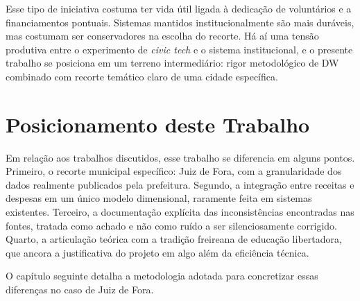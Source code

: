 Esse tipo de iniciativa costuma ter vida útil ligada à dedicação de voluntários e a financiamentos pontuais. Sistemas mantidos institucionalmente são mais duráveis, mas costumam ser conservadores na escolha do recorte. Há aí uma tensão produtiva entre o experimento de \textit{civic tech} e o sistema institucional, e o presente trabalho se posiciona em um terreno intermediário: rigor metodológico de DW combinado com recorte temático claro de uma cidade específica.

\section{Posicionamento deste Trabalho}

Em relação aos trabalhos discutidos, esse trabalho se diferencia em alguns pontos. Primeiro, o recorte municipal específico: Juiz de Fora, com a granularidade dos dados realmente publicados pela prefeitura. Segundo, a integração entre receitas e despesas em um único modelo dimensional, raramente feita em sistemas existentes. Terceiro, a documentação explícita das inconsistências encontradas nas fontes, tratada como achado e não como ruído a ser silenciosamente corrigido. Quarto, a articulação teórica com a tradição freireana de educação libertadora, que ancora a justificativa do projeto em algo além da eficiência técnica.

O capítulo seguinte detalha a metodologia adotada para concretizar essas diferenças no caso de Juiz de Fora.
